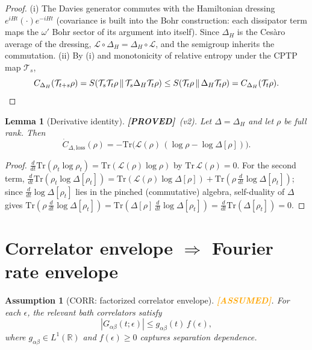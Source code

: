 \documentclass[11pt]{article}
\newtheorem{lemma}[theorem]{Lemma}
\newtheorem{assumption}[theorem]{Assumption}
\theoremstyle{definition}
\theoremstyle{remark}
\newcommand{\ASSUMED}{\textcolor{orange}{\textbf{[ASSUMED]}}}
\newcommand{\PROVED}{\textcolor{green!60!black}{\textbf{[PROVED]}}}
\begin{document}
\begin{proof}
(i) The Davies generator commutes with the Hamiltonian dressing
$e^{iHt}(\cdot)e^{-iHt}$ (covariance is built into the Bohr construction:
each dissipator term maps the $\omega'$ Bohr sector of its argument into
itself). Since $\Delta_H$ is the Ces\`aro average of the dressing,
$\mathcal{L} \circ \Delta_H = \Delta_H \circ \mathcal{L}$, and the
semigroup inherits the commutation. (ii) By (i) and monotonicity of
relative entropy under the CPTP map $\mathcal{T}_s$,
\[
C_{\Delta_H}(\mathcal{T}_{t+s}\rho)
= S(\mathcal{T}_s \mathcal{T}_t \rho \,\|\, \mathcal{T}_s \Delta_H
\mathcal{T}_t \rho)
\le S(\mathcal{T}_t \rho \,\|\, \Delta_H \mathcal{T}_t \rho)
= C_{\Delta_H}(\mathcal{T}_t\rho). \qedhere
\]
\end{proof}

\begin{lemma}[Derivative identity]
\label{lem:deriv}
\PROVED\ (v2). Let $\Delta = \Delta_H$ and let $\rho$ be full rank. Then
\[
\dot{C}_{\Delta,\mathrm{loss}}(\rho)
= -\mathrm{Tr}\bigl(\mathcal{L}(\rho)\,(\log\rho - \log\Delta[\rho])\bigr).
\]
\end{lemma}

\begin{proof}
$\frac{d}{dt}\mathrm{Tr}(\rho_t \log \rho_t) =
\mathrm{Tr}(\mathcal{L}(\rho)\log\rho)$ by $\mathrm{Tr}\,\mathcal{L}(\rho)
= 0$. For the second term, $\frac{d}{dt}\mathrm{Tr}(\rho_t \log
\Delta[\rho_t]) = \mathrm{Tr}(\mathcal{L}(\rho)\log\Delta[\rho]) +
\mathrm{Tr}(\rho \,\tfrac{d}{dt}\log\Delta[\rho_t])$; since
$\tfrac{d}{dt}\log\Delta[\rho_t]$ lies in the pinched (commutative)
algebra, self-duality of $\Delta$ gives
$\mathrm{Tr}(\rho\,\tfrac{d}{dt}\log\Delta[\rho_t]) =
\mathrm{Tr}(\Delta[\rho]\,\tfrac{d}{dt}\log\Delta[\rho_t]) =
\tfrac{d}{dt}\mathrm{Tr}(\Delta[\rho_t]) = 0$.
\end{proof}

\section{Correlator envelope $\Rightarrow$ Fourier rate envelope}

\begin{assumption}[CORR: factorized correlator envelope]
\label{ass:corr}
\ASSUMED. For each $\epsilon$, the relevant bath correlators satisfy
\[
|G_{\alpha\beta}(t;\epsilon)| \le g_{\alpha\beta}(t)\, f(\epsilon),
\]
where $g_{\alpha\beta} \in L^1(\mathbb{R})$ and $f(\epsilon) \ge 0$
captures separation dependence.
\end{assumption}
\end{document}
